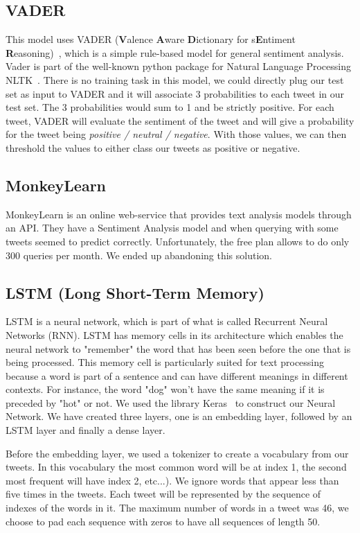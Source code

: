 \documentclass[letterpaper, 10 pt, conference]{ieeeconf}  %
\begin{document}
\subsection{VADER} 

 This model uses VADER (\textbf{V}alence \textbf{A}ware \textbf{D}ictionary for s\textbf{E}ntiment \textbf{R}easoning)~\cite{vader}, which is a simple rule-based model for general sentiment analysis. Vader is part of the well-known python package for Natural Language Processing NLTK~\cite{nltk}. There is no training task in this model, we could directly plug our test set as input to VADER and it will associate 3 probabilities to each tweet in our test set. The 3 probabilities would sum to 1 and be strictly positive. For each tweet, VADER will evaluate the sentiment of the tweet and will give a probability for the tweet being \textit{positive / neutral / negative}. With those values, we can then threshold the values to either class our tweets as positive or negative.

\subsection{MonkeyLearn} 

MonkeyLearn is an online web-service that provides text analysis models through an API. They have a Sentiment Analysis model and when querying with some tweets seemed to predict correctly. Unfortunately, the free plan allows to do only 300 queries per month. We ended up abandoning this solution.

\subsection{LSTM (Long Short-Term Memory) } 

LSTM is a neural network, which is part of what is called Recurrent Neural Networks (RNN). LSTM has memory cells in its architecture which enables the neural network to "remember" the word that has been seen before the one that is being processed. This memory cell is particularly suited for text processing because a word is part of a sentence and can have different meanings in different contexts. For instance, the word "dog" won't have the same meaning if it is preceded by "hot" or not. We used the library Keras~\cite{chollet2015keras} to construct our Neural Network. We have created three layers, one is an embedding layer, followed by an LSTM layer and finally a dense layer. 

Before the embedding layer, we used a tokenizer to create a vocabulary from our tweets. In this vocabulary the most common word will be at index 1, the second most frequent will have index 2, etc...). We ignore words that appear less than five times in the tweets. Each tweet will be represented by the sequence of indexes of the words in it. The maximum number of words in a tweet was 46, we choose to pad each sequence with zeros to have all sequences of length 50. 
\end{document}
